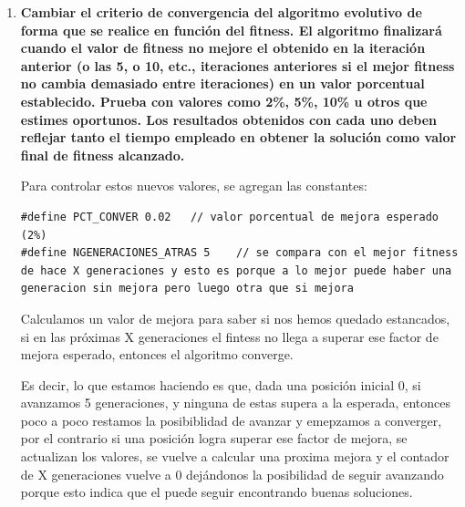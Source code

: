 \documentclass[12pt]{article}
\begin{document}
\begin{enumerate}
\textbf{Fichero \texttt{src/Makefile}.} Hemos añadido la variable \texttt{M\_RATE}, que se pasa como quinto argumento al ejecutable en el objetivo \texttt{test\_sec}. 
Además, hemos incluido \texttt{M\_RATE} en el nombre del fichero de salida (\texttt{out\_N\_M\_NGEN\_TPOB\_MRATE.txt}) para que los resultados de experimentos que 
solo se diferencian en la tasa de mutación no se mezclen en el mismo fichero.

\textbf{Fichero \texttt{input/igen/in.txt}.} Hemos añadido la quinta columna con la tasa de mutación, por ejemplo \texttt{500 200 100 50 0.15}.




    \item \textbf{Cambiar el criterio de convergencia del algoritmo evolutivo de forma que se realice en función
del fitness. El algoritmo finalizará cuando el valor de fitness no mejore el obtenido en la
iteración anterior (o las 5, o 10, etc., iteraciones anteriores si el mejor fitness no cambia
demasiado entre iteraciones) en un valor porcentual establecido. Prueba con valores como
2\%, 5\%, 10\% u otros que estimes oportunos. Los resultados obtenidos con cada uno deben
reflejar tanto el tiempo empleado en obtener la solución como valor final de fitness alcanzado.}

Para controlar estos nuevos valores, se agregan las constantes:

\begin{lstlisting}[style=EstiloC]
#define PCT_CONVER 0.02   // valor porcentual de mejora esperado (2%)
#define NGENERACIONES_ATRAS 5    // se compara con el mejor fitness de hace X generaciones y esto es porque a lo mejor puede haber una generacion sin mejora pero luego otra que si mejora
\end{lstlisting}

Calculamos un valor de mejora para saber si nos hemos quedado estancados, si en las próximas X generaciones 
el fintess no llega a superar ese factor de mejora esperado, entonces el algoritmo converge. 

Es decir, lo que estamos haciendo es que, dada una posición inicial 0, si avanzamos 5 generaciones, y ninguna de estas supera a la esperada, entonces 
poco a poco restamos la posibiblidad de avanzar y emepzamos a converger, por el contrario si una posición logra superar ese factor de mejora, se actualizan los valores, se 
vuelve a calcular una proxima mejora y el contador de X generaciones vuelve a 0 dejándonos la posibilidad de seguir avanzando porque esto indica que el puede seguir encontrando buenas soluciones. 


\end{enumerate}
\end{document}
